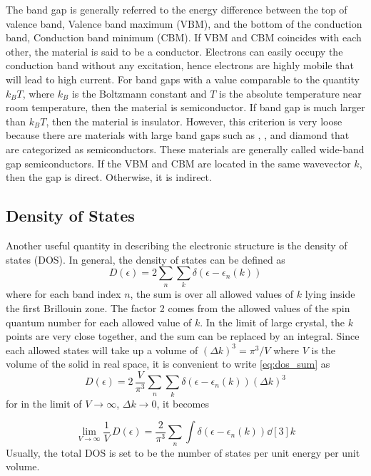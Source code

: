 The band gap is generally referred to the energy difference between the top of valence band, Valence band maximum (VBM),  and the bottom of the conduction band, Conduction band minimum (CBM). If VBM and CBM coincides with each other, the material is said to be a conductor. Electrons can easily occupy the conduction band without any excitation, hence electrons are highly mobile that will lead to high current. For band gaps with a value comparable to the quantity $k_B T$, where $k_B$ is the Boltzmann constant and  $T$ is the absolute temperature near room temperature, then the material is semiconductor. If band gap is much larger than $k_B T$, then the material is insulator. However, this criterion is very loose because there are materials with large band gaps such as , , and diamond that are categorized as semiconductors. These materials are generally called wide-band gap semiconductors. If the VBM and CBM are located in the same wavevector $k$, then the gap is direct. Otherwise, it is indirect.

\subsection{Density of States}
Another useful quantity in describing the electronic structure is the density of states (DOS). In general, the density of states can be defined as \citep{Ashcroft1976}
\begin{equation} \label{eq:dos_sum}
	D(\epsilon) = 2 \sum_n \sum_k \delta(\epsilon - \epsilon_n(k))
\end{equation}
where for each band index $n$, the sum is over all allowed values of $k$ lying inside the first Brillouin zone. The factor 2 comes from the allowed values of the spin quantum number for each allowed value of $k$. In the limit of large crystal, the $k$ points are very close together, and the sum can be replaced by an integral. Since each allowed states will take up a volume of $ (\Delta k)^3 = \pi^3/V$ where $V$ is the volume of the solid in real space, it is convenient to write \eqref{eq:dos_sum} as
\begin{equation} \label{eq:dos_int}
	D(\epsilon) = 2\, \frac{V}{\pi^3} \sum_n \sum_k \delta(\epsilon - \epsilon_n(k)) (\Delta k)^3
\end{equation}
for  in the limit of $V \rightarrow \infty $, $\Delta k \rightarrow 0$, it becomes

\begin{equation}
	\lim_{V \to \infty} \frac{1}{V}\, D(\epsilon) = \frac{2}{\pi^3} \sum_n \int \delta(\epsilon - \epsilon_n(k)) \dd[3]{k}
\end{equation}
Usually, the total DOS is set to be the number of states per unit energy per unit volume.

